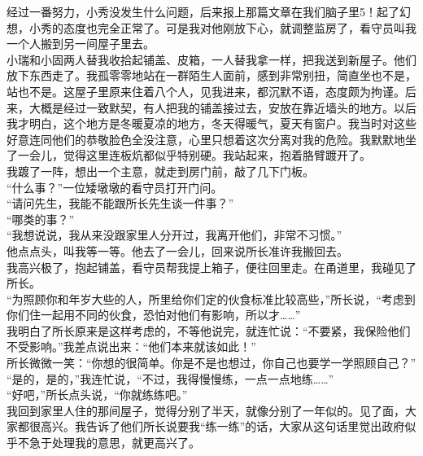 经过一番努力，小秀没发生什么问题，后来报上那篇文章在我们脑子里5！起了幻想，小秀的态度也完全正常了。可是我对他刚放下心，就调整监房了，看守员叫我一个人搬到另一间屋子里去。\\

小瑞和小固两人替我收拾起铺盖、皮箱，一人替我拿一样，把我送到新屋子。他们放下东西走了。我孤零零地站在一群陌生人面前，感到非常别扭，简直坐也不是，站也不是。这屋子里原来住着八个人，见我进来，都沉默不语，态度颇为拘谨。后来，大概是经过一致默契，有人把我的铺盖接过去，安放在靠近墙头的地方。以后我才明白，这个地方是冬暖夏凉的地方，冬天得暖气，夏天有窗户。我当时对这些好意连同他们的恭敬脸色全没注意，心里只想着这次分离对我的危险。我默默地坐了一会儿，觉得这里连板炕都似乎特别硬。我站起来，抱着胳臂踱开了。\\

我踱了一阵，想出一个主意，就走到房门前，敲了几下门板。\\

“什么事？”一位矮墩墩的看守员打开门问。\\

“请问先生，我能不能跟所长先生谈一件事？”\\

“哪类的事？”\\

“我想说说，我从来没跟家里人分开过，我离开他们，非常不习惯。”\\

他点点头，叫我等一等。他去了一会儿，回来说所长准许我搬回去。\\

我高兴极了，抱起铺盖，看守员帮我提上箱子，便往回里走。在甬道里，我碰见了所长。\\

“为照顾你和年岁大些的人，所里给你们定的伙食标准比较高些，”所长说，“考虑到你们住一起用不同的伙食，恐怕对他们有影响，所以才……”\\

我明白了所长原来是这样考虑的，不等他说完，就连忙说：“不要紧，我保险他们不受影响。”我差点说出来：“他们本来就该如此！”\\

所长微微一笑：“你想的很简单。你是不是也想过，你自己也要学一学照顾自己？”\\

“是的，是的，”我连忙说，“不过，我得慢慢练，一点一点地练……”\\

“好吧，”所长点头说，“你就练练吧。”\\

我回到家里人住的那间屋子，觉得分别了半天，就像分别了一年似的。见了面，大家都很高兴。我告诉了他们所长说要我“练一练”的话，大家从这句话里觉出政府似乎不急于处理我的意思，就更高兴了。\\

